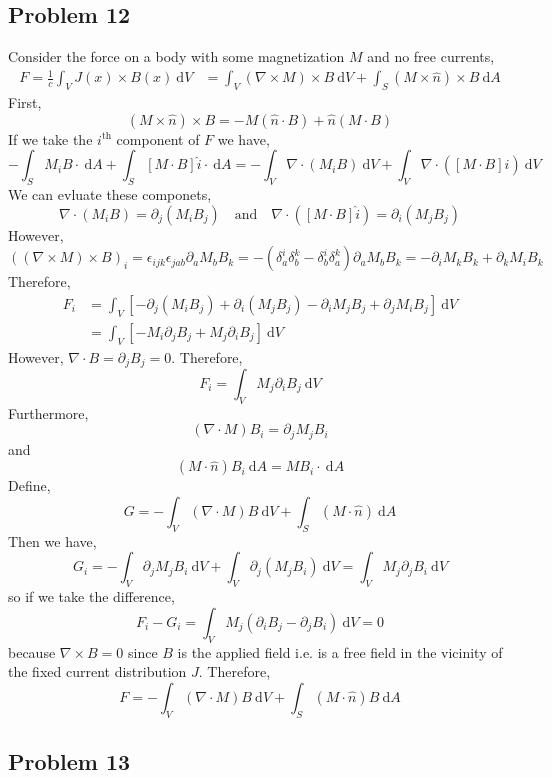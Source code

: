 \documentclass[12pt]{extarticle}
\renewcommand{\d}[1]{\: \mathrm{d}#1}
\theoremstyle{definition}
\begin{document}
\subsection{Problem 12}

Consider the force on a body with some magnetization $M$ and no free currents,
\begin{align*}
F = \frac{1}{c} \int_V J(x) \times B(x) \d{V} & = \int_V (\nabla \times M) \times B \d{V} + \int_S (M \times \hat{n}) \times B \d{A} 
\end{align*}
First,
\[ (M \times \hat{n}) \times B = - M ( \hat{n} \cdot B) + \hat{n} (M \cdot B) \]
If we take the $i^{\mathrm{th}}$ component of $F$ we have,
\[ - \int_S M_i B \cdot \d{A} + \int_S [M \cdot B] \hat{i} \cdot \d{A} = - \int_V \nabla \cdot (M_i B) \d{V} + \int_V \nabla \cdot ([M \cdot B] \hat{i} ) \d{V} \]
We can evluate these componets,
\[ \nabla \cdot (M_i B) = \partial_j (M_i B_j) \quad \text{and} \quad \nabla \cdot ([M \cdot B] \hat{i}) = \partial_i (M_j B_j) \]
However,
\[ ((\nabla \times M) \times B)_i = \epsilon_{i j k} \epsilon_{j ab} \partial_a M_b B_k = -\left( \delta^i_a \delta^k_b - \delta^i_b \delta^k_a \right) \partial_a M_b B_k = - \partial_i M_k B_k + \partial_k M_i B_k   \]
Therefore,
\begin{align*}
F_i & = \int_V \left[ - \partial_j(M_i B_j) + \partial_i(M_j B_j) - \partial_i M_j B_j + \partial_j M_i B_j \right] \d{V}
\\
& = \int_V \left[ - M_i \partial_j B_j + M_j \partial_i B_j \right] \d{V}
\end{align*}
However, $\nabla \cdot B = \partial_j B_j = 0$. Therefore,
\[ F_i = \int_V M_j \partial_i B_j \d{V} \]
Furthermore,
\[ (\nabla \cdot M) B_i = \partial_j M_j B_i \]
and 
\[ (M \cdot \hat{n}) B_i \d{A} = M B_i \cdot \d{A} \]
Define,
\[ G = - \int_V (\nabla \cdot M) B \d{V} + \int_S (M \cdot \hat{n}) \d{A} \]
Then we have,
\[ G_i = - \int_V \partial_j M_j B_i \d{V} + \int_V \partial_j (M_j B_i) \d{V} = \int_V M_j \partial_j B_i \d{V}  \]
so if we take the difference,
\[ F_i  - G_i = \int_V M_j (\partial_i B_j - \partial_j B_i) \d{V} = 0 \]
because $\nabla \times B = 0$ since $B$ is the applied field i.e. is a free field in the vicinity of the fixed current distribution $J$. Therefore,
\[ F = - \int_V (\nabla \cdot M) B \d{V} + \int_S (M \cdot \hat{n}) B \d{A} \]


\subsection{Problem 13}
\end{document}

